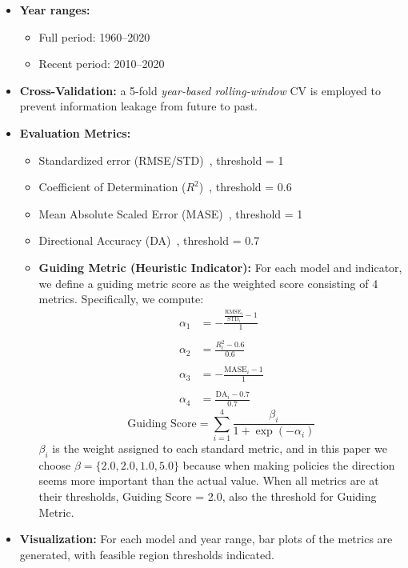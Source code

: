 \documentclass[12pt]{article}
\begin{document}
\begin{itemize}
    \item \textbf{Year ranges:}
    \begin{itemize}
        \item Full period: 1960--2020
        \item Recent period: 2010--2020
    \end{itemize}
    \item \textbf{Cross-Validation:} a 5-fold \emph{year-based rolling-window} CV is employed to prevent information leakage from future to past.
    \item \textbf{Evaluation Metrics:}
    \begin{itemize}
        \item Standardized error (RMSE/STD)~\cite{ChaiDraxler2014}, threshold = 1
        \item Coefficient of Determination ($R^2$)~\cite{Alexander2001}, threshold = 0.6
        \item Mean Absolute Scaled Error (MASE)~\cite{Hyndman2006}, threshold = 1
        \item Directional Accuracy (DA)~\cite{Hyndman2006}, threshold = 0.7
        \item \textbf{Guiding Metric (Heuristic Indicator):} For each model and indicator, we define a guiding metric score as the weighted score consisting of 4 metrics. Specifically, we compute:
        \begin{align*}
        \alpha_1 &= -\frac{\frac{\text{RMSE}_i}{\text{STD}_i} - 1}{1} \\\\
        \alpha_2 &= \frac{R_i^2 - 0.6}{0.6} \\\\
        \alpha_3 &= -\frac{\text{MASE}_i - 1}{1} \\\\
        \alpha_4 &= \frac{\text{DA}_i - 0.7}{0.7}
        \end{align*}
        \[
        \text{Guiding Score} = \sum_{i=1}^4 \frac{\beta_i}{1 + \exp(-\alpha_i)}
        \]
        $\beta_i$ is the weight assigned to each standard metric, and in this paper we choose $\beta = \{2.0, 2.0, 1.0, 5.0\}$ because when making policies the direction seems more important than the actual value. When all metrics are at their thresholds, Guiding Score = 2.0, also the threshold for Guiding Metric.
    \end{itemize}
    \item \textbf{Visualization:} For each model and year range, bar plots of the metrics are generated, with feasible region thresholds indicated.
\end{itemize}
\end{document}
